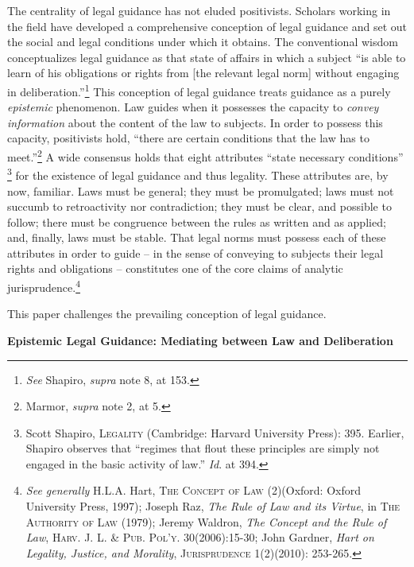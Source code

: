 The centrality of legal guidance has not eluded positivists. Scholars
working in the field have developed a comprehensive conception of legal
guidance and set out the social and legal conditions under which it
obtains. The conventional wisdom conceptualizes legal guidance as that
state of affairs in which a subject ``is able to learn of his
obligations or rights from {[}the relevant legal norm{]} without
engaging in deliberation.''\footnote{\emph{See} Shapiro, \emph{supra}
  note 8, at 153.} This conception of legal guidance treats guidance as
a purely \emph{epistemic} phenomenon. Law guides when it possesses the
capacity to \emph{convey information} about the content of the law to
subjects. In order to possess this capacity, positivists hold, ``there
are certain conditions that the law has to meet.''\footnote{Marmor,
  \emph{supra} note 2, at 5.} A wide consensus holds that eight
attributes ``state necessary conditions'' \footnote{Scott Shapiro,
  \textsc{Legality} (Cambridge: Harvard University Press): 395. Earlier,
  Shapiro observes that ``regimes that flout these principles are simply
  not engaged in the basic activity of law.'' \emph{Id}. at 394.} for
the existence of legal guidance and thus legality. These attributes are,
by now, familiar. Laws must be general; they must be promulgated; laws
must not succumb to retroactivity nor contradiction; they must be clear,
and possible to follow; there must be congruence between the rules as
written and as applied; and, finally, laws must be stable. That legal
norms must possess each of these attributes in order to guide -- in the
sense of conveying to subjects their legal rights and obligations --
constitutes one of the core claims of analytic jurisprudence.\footnote{\emph{See
  generally} H.L.A. Hart, \textsc{The Concept of Law} (2)(Oxford: Oxford
  University Press, 1997); Joseph Raz, \emph{The Rule of Law and its
  Virtue}, in \textsc{The Authority of Law} (1979); Jeremy Waldron,
  \emph{The Concept and the Rule of Law}, \textsc{Harv. J. L. \& Pub.
  Pol'y.} 30(2006):15-30; John Gardner, \emph{Hart on Legality, Justice,
  and Morality}, \textsc{Jurisprudence} 1(2)(2010): 253-265.}

This paper challenges the prevailing conception of legal guidance.

\textbf{Epistemic Legal Guidance: Mediating between Law and
Deliberation}

